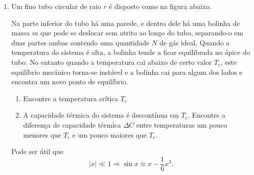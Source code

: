 \begin{enumerate}
    \item
        Um fino tubo circular de raio $r$ é disposto como na figura abaixo.
        \begin{figure}[H]
            \centering
        \end{figure}
        Na parte inferior do tubo há uma parede, e dentro dele há uma bolinha de
        massa $m$ que pode se deslocar sem atrito ao longo do tubo, separando-o
        em duas partes ambas contendo uma quantidade $N$ de gás ideal. Quando a
        temperatura do sistema é alta, a bolinha tende a ficar equilibrada no
        ápice do tubo. No entanto quando a temperatura cai abaixo de certo valor
        $T_c$, este equilíbrio mecânico torna-se instável e a bolinha cai para
        algum dos lados e encontra um novo ponto de equilíbrio.
        \begin{enumerate}
            \item
                Encontre a temperatura crítica $T_c$
            \item
                A capacidade térmica do sistema é descontínua em $T_c$. Encontre
                a diferença de capacidade térmica $\Delta C$ entre temperaturas
                um pouco menores que $T_c$ e um pouco maiores que $T_c$. 
        \end{enumerate}
        Pode ser útil que
        $$|x|\ll1\Rightarrow\sin x\approx x-\frac{1}{6}x^3.$$
\end{enumerate}
